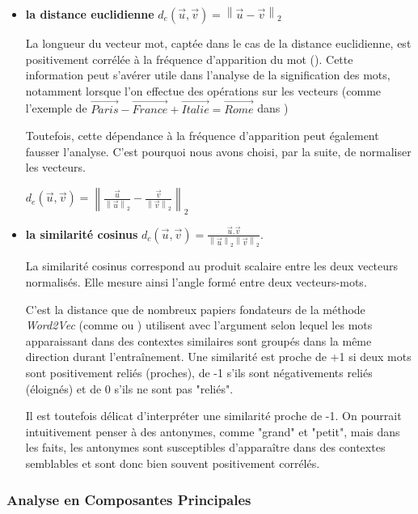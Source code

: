 \documentclass[11pt,french,french]{article}
\begin{document}
\begin{itemize}
\item \textbf{la distance euclidienne} $ d_{e}(\vec{u},\vec{v}) = \left\| \vec{u} - \vec{v}  \right\|_2$

La longueur du vecteur mot, captée dans le cas de la distance euclidienne, est positivement corrélée à la fréquence d'apparition du mot (\cite{Schakel}). Cette information peut s'avérer utile dans l'analyse de la signification des mots, notamment lorsque l'on effectue des opérations sur les vecteurs (comme l'exemple de $\overrightarrow{Paris} - \overrightarrow{France} + \overrightarrow{Italie} = \overrightarrow{Rome}$ dans \cite{Mikolov})

Toutefois, cette dépendance à la fréquence d'apparition peut également fausser l'analyse. C'est pourquoi nous avons choisi, par la suite, de normaliser les vecteurs. 

$ d_{e}(\vec{u},\vec{v}) = \left\| \frac{\vec{u}}{\left\| \vec{u} \right\|_2} - \frac{\vec{v}}{\left\| \vec{v} \right\|_2}  \right\|_2$


\item \textbf{la similarité cosinus} $ d_{c}(\vec{u}, \vec{v}) = \frac{\vec{u}.\vec{v}}{\left\| \vec{u} \right\|_2  \left\| \vec{v} \right\|_2 }$.

La similarité cosinus correspond au produit scalaire entre les deux vecteurs normalisés. Elle mesure ainsi l'angle formé entre deux vecteurs-mots.

C'est la distance que de nombreux papiers fondateurs de la méthode \emph{Word2Vec} (comme \cite{Mikolov} ou \cite{Levy}) utilisent avec l'argument selon lequel les mots apparaissant dans des contextes similaires sont groupés dans la même direction durant l'entraînement. 
Une similarité est proche de +1 si deux mots sont positivement reliés (proches), de -1 s'ils sont négativements reliés (éloignés) et de 0 s'ils ne sont pas "reliés". 

Il est toutefois délicat d'interpréter une similarité proche de -1. On pourrait intuitivement penser à des antonymes, comme "grand" et "petit", mais dans les faits, les antonymes sont susceptibles d'apparaître dans des contextes semblables et sont donc bien souvent positivement corrélés. 

 
\end{itemize}

\hypertarget{analyse-en-composantes-principales}{%
\subsubsection{Analyse en Composantes
Principales}\label{analyse-en-composantes-principales}}
\end{document}
